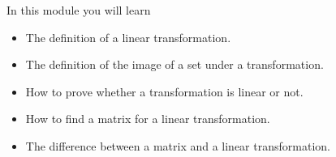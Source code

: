 \documentclass{problemset}
\begin{document}
\begin{module}

	In this module you will learn
	\begin{itemize}
		\item The definition of a linear transformation.
		\item The definition of the image of a set under a transformation.
		\item How to prove whether a transformation is linear or not.
		\item How to find a matrix for a linear transformation.
		\item The difference between a matrix and a linear transformation.
	\end{itemize}

	
\end{module}
\end{document}
